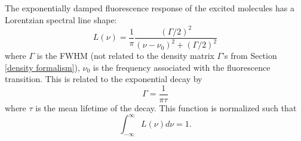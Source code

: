 \label{tail}
The exponentially damped fluorescence response of the excited molecules has a Lorentzian spectral line shape:
\begin{equation}
L(\nu)
=
\frac{1}{\pi}
\frac
{(\Gamma/2)^2}
{(\nu - \nu_{0})^2 + (\Gamma/2)^2}
\label{lorentzian}
\end{equation}
where $\Gamma$ is the FWHM (not related to the density matrix $\Gamma$'s from Section \ref{density formalism}), $\nu_{0}$ is the frequency associated with the fluorescence transition. This is related to the exponential decay by
\begin{equation}
\Gamma=\frac{1}{\pi \tau}
\end{equation}
where $\tau$ is the mean lifetime of the decay. This function is normalized such that
\begin{equation}
\int^{\infty}_{-\infty} L(\nu)d\nu = 1.
\end{equation}

